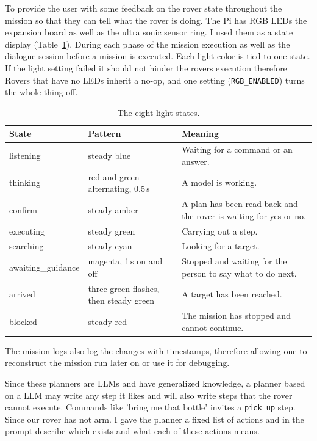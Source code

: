 \label{ssec:lights}

To provide the user with some feedback on the rover state throughout the mission so that they can tell what the rover is doing. The Pi has RGB LEDs
the expansion board as well as the ultra sonic sensor ring. I used them as a state display (Table~\ref{tab:lights}). During each phase of the mission execution as
well as the dialogue session before a mission is executed. Each light color is tied to one state.  If the light setting failed it should not hinder the rovers execution therefore
Rovers that have no LEDs inherit a no-op, and one setting (\texttt{RGB\_ENABLED}) turns the whole thing off.

\begin{table}[htbp]
  \centering
  \caption{The eight light states.}
  \label{tab:lights}
  \small
  \begin{tabular}{@{}l l p{6.6cm}@{}}
    \toprule
    State & Pattern & Meaning \\
    \midrule
    listening & steady blue & Waiting for a command or an answer. \\
    thinking & red and green alternating, 0.5\,s & A model is working. \\
    confirm & steady amber & A plan has been read back and the rover is waiting for yes or no. \\
    executing & steady green & Carrying out a step. \\
    searching & steady cyan & Looking for a target. \\
    awaiting\_guidance & magenta, 1\,s on and off & Stopped and waiting for the person to say what to do next. \\
    arrived & three green flashes, then steady green & A target has been reached. \\
    blocked & steady red & The mission has stopped and cannot continue. \\
    \bottomrule
  \end{tabular}
\end{table}

The mission logs also log the changes with timestamps, therefore allowing one to reconstruct the mission run  later on or use it for debugging.



\label{sec:vocabulary}

Since these planners are LLMs and have generalized knowledge, a planner based on a LLM may write any step it likes and will also write steps that the rover 
cannot execute. Commands like 'bring me that bottle' invites a \texttt{pick\_up} step. Since our rover has not arm. I gave the planner a fixed list of actions and 
in the prompt describe which exists and what each of these actions means. 

